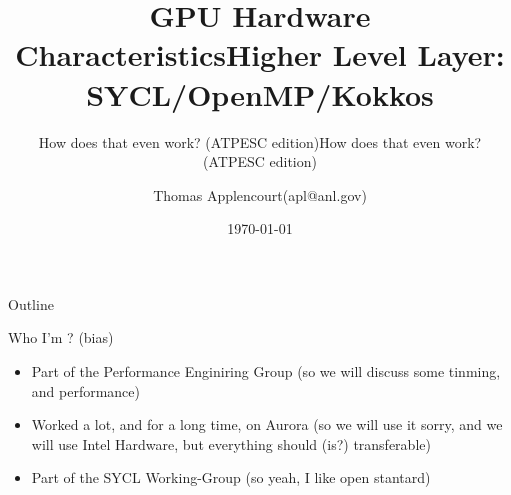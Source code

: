\documentclass[aspectratio=169]{beamer}
\title{GPU Hardware Characteristics}
\subtitle{How does that even work? (ATPESC edition)}
\date{\today}
\author{Thomas Applencourt(apl@anl.gov)}
\begin{document}
\maketitle

\begin{frame}{Outline}
\tableofcontents[hideallsubsections]
\end{frame}



\begin{frame}{Who I'm ? (bias)}
\begin{itemize}
    \item Part of the Performance Enginiring Group (so we will discuss some tinming, and performance)
    \item Worked a lot, and for a long time, on Aurora (so we will use it sorry, and we will use Intel Hardware, but everything should (is?) transferable)
    \item Part of the SYCL Working-Group (so yeah, I like open stantard)
\end{itemize}
\end{frame}


\title{Higher Level Layer: SYCL/OpenMP/Kokkos}
\subtitle{How does that even work? (ATPESC edition)}
\maketitle




\end{document}
